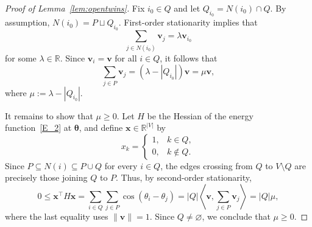 \documentclass[11pt,reqno]{amsart}
\theoremstyle{definition}
\begin{document}
\begin{proof}[Proof of Lemma~\ref{lem:opentwins}]
Fix $i_0\in Q$ and let $Q_{i_0}=N(i_0)\cap Q$.
By assumption, $N(i_0)=P\sqcup Q_{i_0}$.
First-order stationarity implies that
\[
    \sum_{j\in N(i_0)}\mathbf{v}_j
    =\lambda\mathbf{v}_{i_0}
\]
for some $\lambda\in\mathbb{R}$.
Since $\mathbf{v}_i=\mathbf{v}$ for all $i\in Q$, it follows that
\[
    \sum_{j\in P}\mathbf{v}_j
    =(\lambda-|Q_{i_0}|)\mathbf{v}
    =\mu\mathbf{v},
\]
where $\mu:=\lambda-|Q_{i_0}|$.

It remains to show that $\mu\ge0$.
Let $H$ be the Hessian of the energy function~\eqref{E_2}
at $\boldsymbol{\theta}$, and define
$\boldsymbol{x}\in\mathbb{R}^{|V|}$ by
\[
    x_k=
    \begin{cases}
        1, & k\in Q,\\
        0, & k\notin Q.
    \end{cases}
\]
Since $P\subseteq N(i)\subseteq P\cup Q$ for every $i\in Q$,
the edges crossing from $Q$ to $V\setminus Q$ are precisely
those joining $Q$ to $P$.
Thus, by second-order stationarity,
\[
    0\le \boldsymbol{x}^{\top}H\boldsymbol{x}
    =\sum_{i\in Q}\sum_{j\in P}\cos(\theta_i-\theta_j)
    =|Q|\left\langle
        \mathbf{v},\sum_{j\in P}\mathbf{v}_j
      \right\rangle
    =|Q|\mu,
\]
where the last equality uses $\|\mathbf{v}\|=1$.
Since $Q\neq\varnothing$, we conclude that $\mu\ge0$.
\end{proof}
\end{document}
